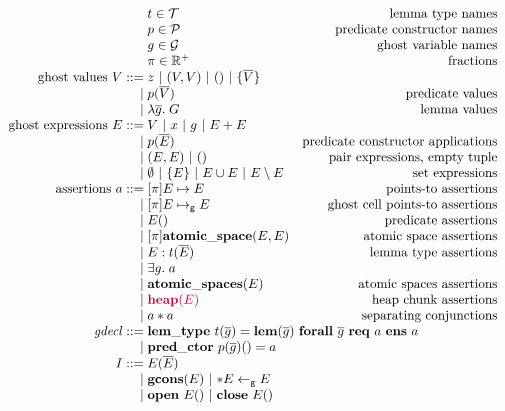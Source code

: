 \documentclass{article}
\newcommand{\gmapsto}{\mapsto_\mathsf{g}}
\newcommand{\internal}[1]{{\color{purple} #1}}
\begin{document}
\begin{figure}
$$\begin{array}{r @{\;} l r}
& t \in \mathcal{T} & \textrm{lemma type names}\\
& p \in \mathcal{P} & \textrm{predicate constructor names}\\
& g \in \mathcal{G} & \textrm{ghost variable names}\\
& \pi \in \mathbb{R}^+ & \textrm{fractions}\\
\textrm{ghost values $V$} ::= & z\ |\ (V, V)\ |\ ()\ |\ \{\overline{V}\}\\
| & p(\overline{V}) & \textrm{predicate values}\\
| & \lambda \overline{g}.\;G & \textrm{lemma values}\\
\textrm{ghost expressions $E$} ::= & V\ |\ x\ |\ g\ |\ E + E\\
| & p(\overline{E}) & \textrm{predicate constructor applications}\\
| & (E, E)\ |\ () & \textrm{pair expressions, empty tuple}\\
| & \emptyset\ |\ \{E\}\ |\ E \cup E\ |\ E \setminus E & \textrm{set expressions}\\
\textrm{assertions $a$} ::= & [\pi]E \mapsto E & \textrm{points-to assertions}\\
| & [\pi]E \gmapsto E & \textrm{ghost cell points-to assertions}\\
| & E() & \textrm{predicate assertions}\\
| & [\pi]\mathbf{atomic\_space}(E, E) & \textrm{atomic space assertions}\\
| & E : t(\overline{E}) & \textrm{lemma type assertions}\\
| & \exists g.\;a\\
| & \mathbf{atomic\_spaces}(E) & \textrm{atomic spaces assertions}\\
| & \internal{\mathbf{heap}(E)} & \textrm{heap chunk assertions}\\
| & a * a & \textrm{separating conjunctions}\\
\mathit{gdecl} ::= & \multicolumn{2}{@{} l @{}}{\mathbf{lem\_type}\ t(\overline{g}) = \mathbf{lem}(\overline{g})\ \mathbf{forall}\ \overline{g}\ \mathbf{req}\ a\ \mathbf{ens}\ a}\\
| & \mathbf{pred\_ctor}\ p(\overline{g})() = a\\
I ::= & E(\overline{E})\\
| & \mathbf{gcons}(E)\ |\ {*}E \leftarrow_\mathsf{g} E\\
| & \mathbf{open}\ E()\ |\ \mathbf{close}\ E()\\

\end{array}$$
\end{figure}
\end{document}
